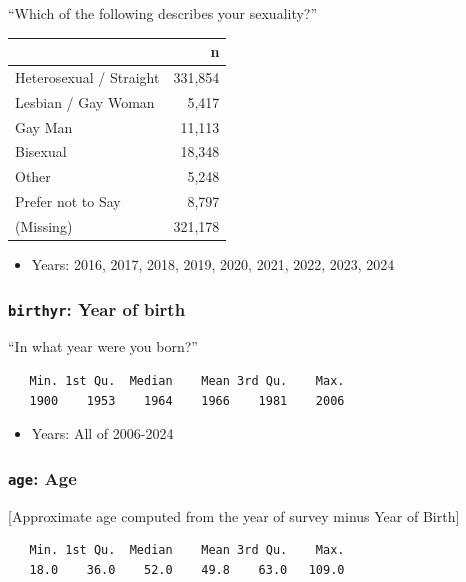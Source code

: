 \documentclass[10pt,article,oneside]{memoir}
\begin{document}
``Which of the following describes your sexuality?''

\begin{table}[H]
\centering
\begin{tabular}[t]{lr}
\toprule
 & n\\
\midrule
Heterosexual / Straight & 331,854\\
Lesbian / Gay Woman & 5,417\\
Gay Man & 11,113\\
Bisexual & 18,348\\
Other & 5,248\\
Prefer not to Say & 8,797\\
(Missing) & 321,178\\
\bottomrule
\end{tabular}
\end{table}

\begin{itemize}
\tightlist
\item
  Years: 2016, 2017, 2018, 2019, 2020, 2021, 2022, 2023, 2024
\end{itemize}

\subsubsection{\texorpdfstring{\texttt{birthyr}: Year of
birth}{birthyr: Year of birth}}\label{birthyr-year-of-birth}

``In what year were you born?''

\begin{verbatim}
   Min. 1st Qu.  Median    Mean 3rd Qu.    Max. 
   1900    1953    1964    1966    1981    2006 
\end{verbatim}

\begin{itemize}
\tightlist
\item
  Years: All of 2006-2024
\end{itemize}

\subsubsection{\texorpdfstring{\texttt{age}:
Age}{age: Age}}\label{age-age}

{[}Approximate age computed from the year of survey minus Year of
Birth{]}

\begin{verbatim}
   Min. 1st Qu.  Median    Mean 3rd Qu.    Max. 
   18.0    36.0    52.0    49.8    63.0   109.0 
\end{verbatim}
\end{document}
